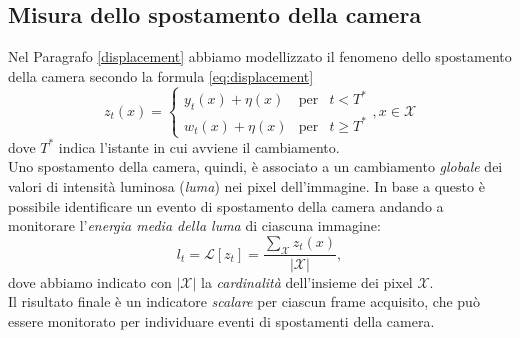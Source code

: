 \subsection{Misura dello spostamento della camera}
Nel Paragrafo \ref{displacement} abbiamo modellizzato il fenomeno dello spostamento della camera secondo la formula \eqref{eq:displacement}
\[z_t(x)  = \left\{ \begin{array}{rcl}
y_t(x) + \eta(x) & \mbox{per} & t < T^* \\
w_t(x) + \eta(x) & \mbox{per} & t \geqslant T^*
\end{array}\right. , x \in \mathcal{X}\]
dove $T^*$ indica l'istante in cui avviene il cambiamento.\\
Uno spostamento della camera, quindi, \`e associato a un cambiamento \textit{globale} dei valori di intensit\`a luminosa (\textit{luma}) nei pixel dell'immagine.
In base a questo \`e possibile identificare un evento di spostamento della camera andando a monitorare l'\textit{energia media della luma} di ciascuna immagine:
\begin{equation}
\label{eq:energyLuma}
l_t = \mathcal{L}[z_t] =\frac{\sum_{\mathcal{X}} z_t(x) }{|\mathcal{X}|} ,
\end{equation}  
dove abbiamo indicato con $|\mathcal{X}|$ la \textit{cardinalit\`a} dell'insieme dei pixel $\mathcal{X}$.\\
Il risultato finale \`e un indicatore \textit{scalare} per ciascun frame acquisito, che pu\`o essere monitorato per individuare eventi di spostamenti della camera. 
